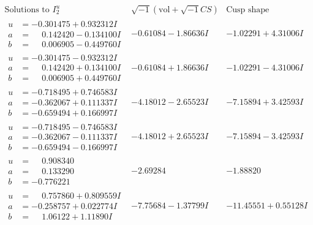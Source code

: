 \documentclass[1p]{elsarticle_modified}
\theoremstyle{definition}
\newcommand{\I}{\sqrt{-1}}
\begin{document}
$$\begin{array}{c|c|c}  
\text{Solutions to }I^u_{2}& \I (\text{vol} + \sqrt{-1}CS) & \text{Cusp shape}\\
 \hline 
\begin{aligned}
u &= -0.301475 + 0.932312 I \\
a &= \phantom{-}0.142420 - 0.134100 I \\
b &= \phantom{-}0.006905 - 0.449760 I\end{aligned}
 & -0.61084 - 1.86636 I & -1.02291 + 4.31006 I \\ \hline\begin{aligned}
u &= -0.301475 - 0.932312 I \\
a &= \phantom{-}0.142420 + 0.134100 I \\
b &= \phantom{-}0.006905 + 0.449760 I\end{aligned}
 & -0.61084 + 1.86636 I & -1.02291 - 4.31006 I \\ \hline\begin{aligned}
u &= -0.718495 + 0.746583 I \\
a &= -0.362067 + 0.111337 I \\
b &= -0.659494 + 0.166997 I\end{aligned}
 & -4.18012 - 2.65523 I & -7.15894 + 3.42593 I \\ \hline\begin{aligned}
u &= -0.718495 - 0.746583 I \\
a &= -0.362067 - 0.111337 I \\
b &= -0.659494 - 0.166997 I\end{aligned}
 & -4.18012 + 2.65523 I & -7.15894 - 3.42593 I \\ \hline\begin{aligned}
u &= \phantom{-}0.908340\phantom{ +0.000000I} \\
a &= \phantom{-}0.133290\phantom{ +0.000000I} \\
b &= -0.776221\phantom{ +0.000000I}\end{aligned}
 & -2.69284\phantom{ +0.000000I} & -1.88820\phantom{ +0.000000I} \\ \hline\begin{aligned}
u &= \phantom{-}0.757860 + 0.809559 I \\
a &= -0.258757 + 0.022774 I \\
b &= \phantom{-}1.06122 + 1.11890 I\end{aligned}
 & -7.75684 - 1.37799 I & -11.45551 + 0.55128 I \\ \hline\begin{aligned}

\end{aligned}
\end{array}$$
\end{document}
